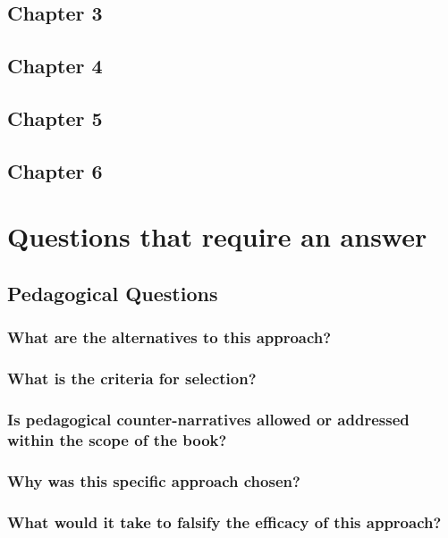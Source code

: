 \documentclass[12pt]{article}
\begin{document}
	\subsection{Chapter 3}
	\subsection{Chapter 4}
	\subsection{Chapter 5}
	\subsection{Chapter 6}

	\section{Questions that require an answer}
	\subsection{Pedagogical Questions}
	\subsubsection{What are the alternatives to this approach?}
	\subsubsection{What is the criteria for selection?}
	\subsubsection{Is pedagogical counter-narratives allowed or addressed within the scope of the book?}
	\subsubsection{Why was this specific approach chosen?}
	\subsubsection{What would it take to falsify the efficacy of this approach?}
\end{document}
